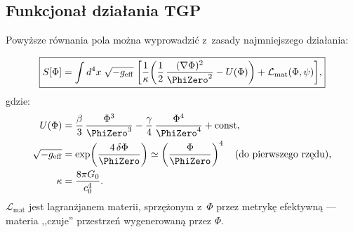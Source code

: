 \subsection{Funkcjona\l{} dzia\l{}ania TGP}\label{ssec:action}

Powy\.zsze r\'ownania pola mo\.zna wyprowadzi\'c z~zasady
najmniejszego dzia\l{}ania:

\begin{hypothesis}\label{hyp:action}
\begin{equation}\label{eq:action}
  \boxed{
    S[\Phi] = \int d^4x\;\sqrt{-g_{\mathrm{eff}}}\;\biggl[
      \frac{1}{\kappa}\biggl(
        \frac{1}{2}\,\frac{(\nabla\Phi)^2}{\PhiZero^2}
        - U(\Phi)
      \biggr)
      + \mathcal{L}_{\mathrm{mat}}(\Phi,\psi)
    \biggr],
  }
\end{equation}
gdzie:
\begin{align}
  U(\Phi) &= \frac{\beta}{3}\,\frac{\Phi^3}{\PhiZero^3}
           - \frac{\gamma}{4}\,\frac{\Phi^4}{\PhiZero^4}
           + \mathrm{const}, \label{eq:U-potential}\\
  \sqrt{-g_{\mathrm{eff}}} &= \exp\!\left(\frac{4\,\delta\Phi}{\PhiZero}
           \right) \simeq \left(\frac{\Phi}{\PhiZero}\right)^4
           \quad\text{(do pierwszego rz\k{e}du),} \\
  \kappa &= \frac{8\pi G_0}{c_0^4}.
\end{align}
$\mathcal{L}_{\mathrm{mat}}$ jest lagran\.zjanem materii,
sprz\k{e}\.zonym z~$\Phi$ przez metryk\k{e} efektywn\k{a} ---
materia ,,czuje'' przestrze\'n wygenerowan\k{a} przez $\Phi$.
\end{hypothesis}

